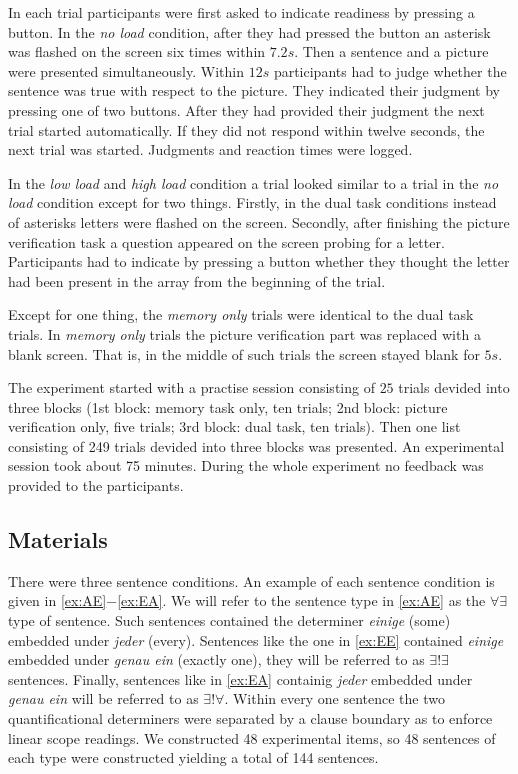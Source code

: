 \documentclass[a4paper,10pt]{article}
\begin{document}
In each trial participants were first asked to indicate readiness by pressing a button. In the {\it no load} condition, after they had pressed the button an  asterisk was flashed on the screen six times within $7.2s$. Then a sentence and a picture were presented simultaneously. Within $12s$ participants had to judge whether the sentence was true with respect to the picture. They indicated their judgment by pressing one of two buttons. After they had provided their judgment the next trial started automatically. If they did not respond within twelve seconds, the next trial was started. Judgments and reaction times were logged.

In the {\it low load} and {\it high load} condition a trial looked similar to a trial in the {\it no load} condition except for two things. Firstly, in the dual task conditions instead of asterisks letters were flashed on the screen. Secondly, after finishing the picture verification task a question appeared on the screen probing for a letter. Participants had to indicate by pressing a button whether they thought the letter had been present in the array from the beginning of the trial.

Except for one thing, the {\it memory only} trials were identical to the dual task trials. In {\it memory only} trials the picture verification part was replaced with a blank screen. That is, in the middle of such trials the screen stayed blank for $5s$. 

The experiment started with a practise session consisting of $25$ trials devided into three blocks (1st block: memory task only, ten trials; 2nd block: picture verification only, five trials; 3rd block: dual task, ten trials). Then one list consisting of 249 trials devided into three blocks was presented. An experimental session took about 75 minutes. During the whole experiment no feedback was provided to the participants.

\subsection{Materials}

There were three sentence conditions. An example of each sentence condition is given in \ref{ex:AE}$-$\ref{ex:EA}. We will refer to the sentence type in \ref{ex:AE} as the $\forall \exists$ type of sentence. Such sentences contained the determiner {\it einige} (some) embedded under {\it jeder} (every). Sentences like the one in \ref{ex:EE}  contained {\it einige} embedded under {\it genau ein} (exactly one), they will be referred to as $\exists ! \exists$ sentences. Finally, sentences like in \ref{ex:EA}  containig {\it jeder} embedded under {\it genau ein} will be referred to as $\exists ! \forall$.  Within every one sentence the two quantificational determiners were separated by a clause boundary as to enforce linear scope readings. We constructed 48 experimental items, so  48 sentences of each type were constructed yielding a total of 144 sentences.
\end{document}
